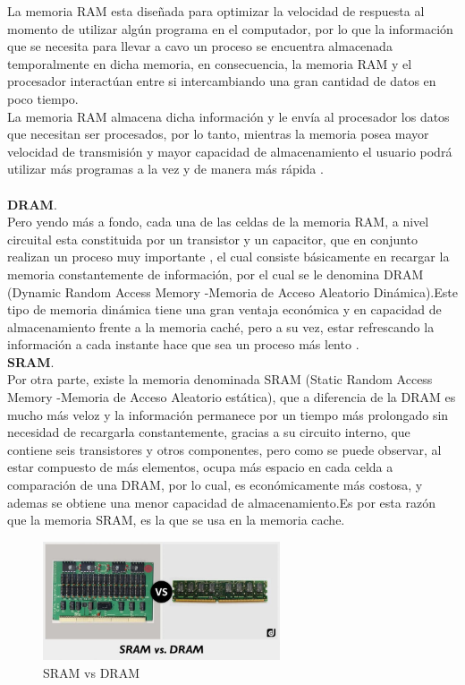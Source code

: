 \documentclass{article}
\begin{document}
La memoria RAM esta diseñada para optimizar la velocidad de respuesta al momento de utilizar algún
programa en el computador, por lo que la información que se necesita para llevar a cavo un proceso se encuentra almacenada temporalmente en dicha memoria, en consecuencia, la memoria RAM y el procesador interactúan entre si intercambiando una gran cantidad de datos en poco tiempo.\\

La memoria RAM almacena dicha información y le envía al procesador los datos que necesitan
ser procesados, por lo tanto, mientras la memoria posea mayor velocidad de transmisión y
mayor capacidad de almacenamiento el usuario podrá utilizar más programas a la vez y de
manera más rápida \cite{apuntes}.\\\\
\noindent
\textbf{DRAM}.\\
Pero yendo más a fondo, cada una de las celdas de la memoria RAM, a nivel circuital esta constituida por un transistor y un capacitor, que en conjunto realizan un proceso muy importante , el cual consiste básicamente en recargar la memoria constantemente de información, por el cual se le denomina DRAM (Dynamic Random Access Memory -Memoria de Acceso Aleatorio Dinámica).Este tipo de memoria dinámica tiene una gran ventaja económica y en capacidad de almacenamiento frente a la memoria caché, pero a su vez, estar refrescando la información a cada instante hace que sea un proceso más  lento \cite{augusto}.\\

\noindent
\textbf{SRAM}.\\
Por otra parte, existe la memoria denominada SRAM (Static Random Access Memory -Memoria de Acceso Aleatorio estática), que a diferencia de la DRAM es mucho más veloz y la información permanece por un tiempo más prolongado sin necesidad de recargarla constantemente, gracias a su circuito interno, que contiene seis transistores y otros componentes, pero como se puede observar, al estar compuesto de más elementos, ocupa más espacio en cada celda a comparación de una DRAM, por lo cual, es económicamente más costosa, y ademas se obtiene una menor capacidad de almacenamiento.Es por esta razón que la memoria SRAM, es la que se usa en la memoria cache.
\begin{figure}[h]
\includegraphics[width=7cm]{vs.jpg}
\centering
\caption{SRAM vs DRAM}
\label{vs}
\end{figure}
\end{document}
